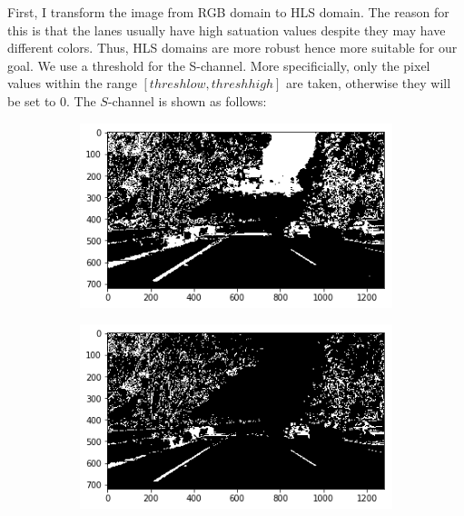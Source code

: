 \documentclass[draftcls,onecolumn,12pt]{IEEEtran}
\theoremstyle{plain}
\theoremstyle{plain}
\begin{document}
First, I transform the image from RGB domain to HLS domain. The reason for this is that the lanes usually have high satuation values despite they may have different colors. Thus, HLS domains are more robust hence more suitable for our goal. We use a threshold for the S-channel. More specificially, only the pixel values within the range $[thresh low, thresh high]$ are taken, otherwise they will be set to 0. The $S$-channel is shown as follows:
\begin{figure}[htb!!]
    \centering
   \begin{subfigure}[t]{0.3\textwidth}
        \includegraphics[width=\textwidth]{./figures/schannel100.png}\\
        \caption{}
    \end{subfigure}
    \hspace{-0.5cm}
    \begin{subfigure}[t]{0.3\textwidth}
        \includegraphics[width=\textwidth]{./figures/schannel.png}\\
        \caption{}
    \end{subfigure}

\end{figure}
\end{document}

